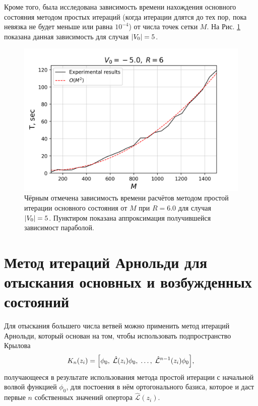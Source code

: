 \documentclass[10pt]{article}
\begin{document}
Кроме того, была исследована зависимость времени нахождения основного состояния методом простых итераций (когда итерации длятся до тех пор, пока невязка не будет меньше или равна  $10^{-4}$) от числа точек сетки $M$. На Рис. \ref{fig:T_vs_M_5_l0} показана данная зависимость для случая $\abs{V_0}=5$.
\begin{figure}
 \centering
 \includegraphics[width=\textwidth]{../figures/T_vs_M_5.0_l0}
 \caption{Чёрным отмечена зависимость времени расчётов методом простой итерации основного состояния от $M$ при $R=6.0$ для случая $\abs{V_0}=5$. Пунктиром показана аппроксимация получившейся зависимост параболой.}
 \label{fig:T_vs_M_5_l0}
\end{figure}

\section{Метод итераций Арнольди для отыскания основных и возбужденных состояний}

Для отыскания большего числа ветвей можно применить метод итераций Арнольди, который основан на том, чтобы использовать подпространство Крылова
$$
K_n(z_i) = \qty[\phi_0,\; \hat{\mathcal{L}}(z_i)\phi_0,\; \ldots,\; \hat{\mathcal{L}}^{n-1}(z_i)\phi_0],
$$
получающееся в результате использования метода простой итерации с начальной волвой функцией $\phi_0$, для постоения в нём ортогонального базиса, которое и даст первые $n$ собственных значений опертора $\hat{\mathcal{L}}(z_i)$.
\end{document}
